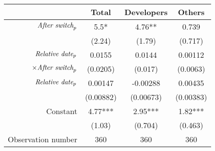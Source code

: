\begin{tabular}{|r|c|c|c|}
\hline
&  Total & Developers & Others \\
\hline
$\mbox{\emph{After switch}}_p$ & 5.5* & 4.76** & 0.739 \\
 & (2.24) & (1.79) & (0.717) \\
\hline
$\mbox{\emph{Relative date}}_p$ & 0.0155 & 0.0144 & 0.00112 \\
$\times \mbox{\emph{After switch}}_p$ & (0.0205) & (0.017) & (0.0063) \\
\hline
$\mbox{\emph{Relative date}}_p$ & 0.00147 & -0.00288 & 0.00435 \\
 & (0.00882) & (0.00673) & (0.00383) \\
\hline
Constant & 4.77*** & 2.95*** & 1.82*** \\
 & (1.03) & (0.704) & (0.463) \\
\hline
Observation number & 360 & 360 & 360 \\
\hline
\end{tabular}